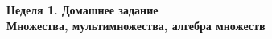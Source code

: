 \documentclass[12pt]{article}
\begin{document}
%
  
  
  
  
  


  \providecommand{\hiddenAnswer}[1]{}
  \providecommand{\hiddenTask}[1]{\task{#1}}

  \begin{center}%
    \bfseries\LARGE Неделя 1. Домашнее задание \\ 
    \Huge Множества, мультимножества, алгебра множеств
  \end{center}

  
\end{document}
